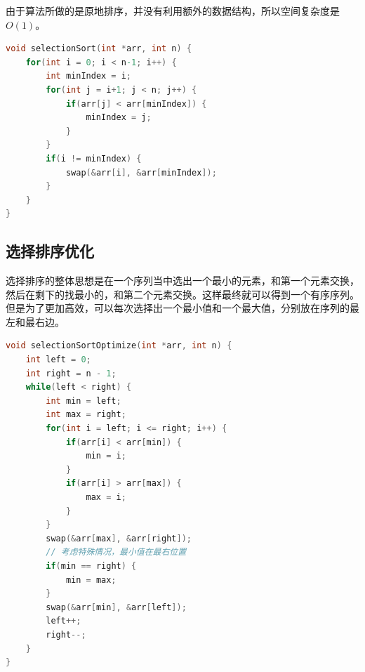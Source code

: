 由于算法所做的是原地排序，并没有利用额外的数据结构，所以空间复杂度是$ O(1) $。

\begin{table}[H]
    \centering
    \caption{选择排序算法分析}
\end{table}


\begin{lstlisting}[language=C]
void selectionSort(int *arr, int n) {
    for(int i = 0; i < n-1; i++) {
        int minIndex = i;
        for(int j = i+1; j < n; j++) {
            if(arr[j] < arr[minIndex]) {
                minIndex = j;
            }
        }
        if(i != minIndex) {
            swap(&arr[i], &arr[minIndex]);
        }
    }
}
\end{lstlisting}

\subsection{选择排序优化}

选择排序的整体思想是在一个序列当中选出一个最小的元素，和第一个元素交换，然后在剩下的找最小的，和第二个元素交换。这样最终就可以得到一个有序序列。但是为了更加高效，可以每次选择出一个最小值和一个最大值，分别放在序列的最左和最右边。 \\


\begin{lstlisting}[language=C]
void selectionSortOptimize(int *arr, int n) {
    int left = 0;
    int right = n - 1;
    while(left < right) {
        int min = left;
        int max = right;
        for(int i = left; i <= right; i++) {
            if(arr[i] < arr[min]) {
                min = i;
            }
            if(arr[i] > arr[max]) {
                max = i;
            }
        }
        swap(&arr[max], &arr[right]);
        // 考虑特殊情况，最小值在最右位置
        if(min == right) {
            min = max;
        }
        swap(&arr[min], &arr[left]);
        left++;
        right--;
    }
}
\end{lstlisting}

